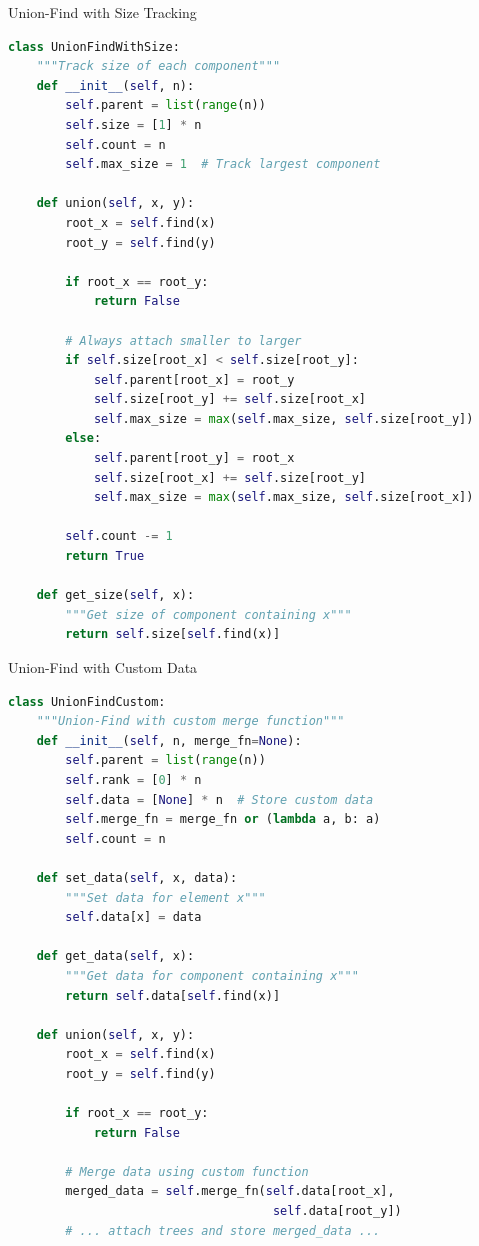 \documentclass[aspectratio=169]{beamer}
\begin{document}
\begin{frame}[fragile]{Union-Find with Size Tracking}
  \begin{lstlisting}[language=Python, basicstyle=\ttfamily\footnotesize]
class UnionFindWithSize:
    """Track size of each component"""
    def __init__(self, n):
        self.parent = list(range(n))
        self.size = [1] * n
        self.count = n
        self.max_size = 1  # Track largest component

    def union(self, x, y):
        root_x = self.find(x)
        root_y = self.find(y)

        if root_x == root_y:
            return False

        # Always attach smaller to larger
        if self.size[root_x] < self.size[root_y]:
            self.parent[root_x] = root_y
            self.size[root_y] += self.size[root_x]
            self.max_size = max(self.max_size, self.size[root_y])
        else:
            self.parent[root_y] = root_x
            self.size[root_x] += self.size[root_y]
            self.max_size = max(self.max_size, self.size[root_x])

        self.count -= 1
        return True

    def get_size(self, x):
        """Get size of component containing x"""
        return self.size[self.find(x)]
  \end{lstlisting}
\end{frame}

\begin{frame}[fragile]{Union-Find with Custom Data}
  \begin{lstlisting}[language=Python, basicstyle=\ttfamily\footnotesize]
class UnionFindCustom:
    """Union-Find with custom merge function"""
    def __init__(self, n, merge_fn=None):
        self.parent = list(range(n))
        self.rank = [0] * n
        self.data = [None] * n  # Store custom data
        self.merge_fn = merge_fn or (lambda a, b: a)
        self.count = n

    def set_data(self, x, data):
        """Set data for element x"""
        self.data[x] = data

    def get_data(self, x):
        """Get data for component containing x"""
        return self.data[self.find(x)]

    def union(self, x, y):
        root_x = self.find(x)
        root_y = self.find(y)

        if root_x == root_y:
            return False

        # Merge data using custom function
        merged_data = self.merge_fn(self.data[root_x],
                                     self.data[root_y])
        # ... attach trees and store merged_data ...
  \end{lstlisting}
\end{frame}
\end{document}
